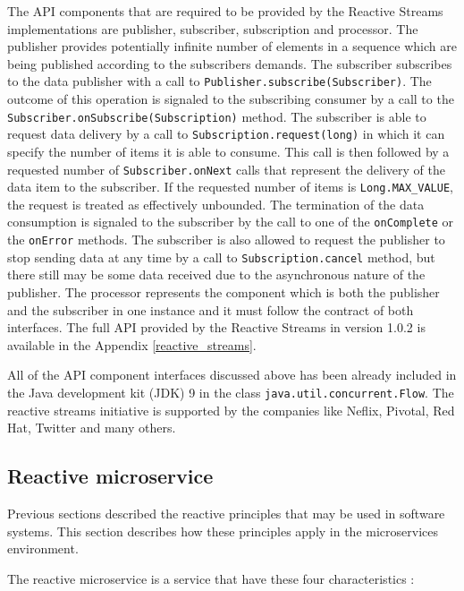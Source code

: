 \documentclass[oneside,
  digital, %
  table,   %
  lof,     %
  lot,     %
]{fithesis3}
\begin{document}
The API components that are required to be provided by the Reactive Streams implementations are publisher, subscriber, subscription and processor. The publisher provides potentially infinite number of elements in a sequence which are being published according to the subscribers demands. The subscriber subscribes to the data publisher with a call to \texttt{Publisher.subscribe(Subscriber)}. The outcome of this operation is signaled to the subscribing consumer by a call to the \texttt{Subscriber.onSubscribe(Subscription)} method. The subscriber is  able to request data delivery by a call to \texttt{Subscription.request(long)} in which it can specify the number of items it is able to consume. This call is then followed by a requested number of \texttt{Subscriber.onNext} calls that represent the delivery of the data item to the subscriber. If the requested number of items is \texttt{Long.MAX\_VALUE}, the request is treated as effectively unbounded. The termination of the data consumption is signaled to the subscriber by the call to one of the \texttt{onComplete} or the \texttt{onError} methods. The subscriber is also allowed to request the publisher to stop sending data at any time by a call to \texttt{Subscription.cancel} method, but there still may be some data received due to the asynchronous nature of the publisher. The processor represents the component which is both the publisher and the subscriber in one instance and it must follow the contract of both interfaces. The full API provided by the Reactive Streams in version 1.0.2 is available in the Appendix \ref{reactive_streams}.

All of the API component interfaces discussed above has been already included in the Java development kit (JDK) 9 in the class \texttt{java.util.concurrent.Flow}. The reactive streams initiative is supported by the companies like Neflix, Pivotal, Red Hat, Twitter and many others.

\subsection{Reactive microservice}

Previous sections described the reactive principles that may be used in software systems. This section describes how these principles apply in the microservices environment.

The reactive microservice is a service that have these four characteristics \cite{building_reactive_ms_in_java}:
\end{document}
